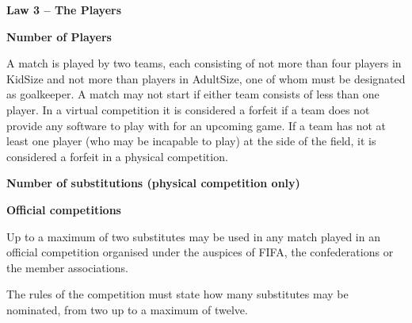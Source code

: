 \clearpage
\sffamily

{\bfseries\color[rgb]{0.4,0.4,0.4}
Law 3 -- The Players}
{}


\bigskip

{\bfseries Number of Players}

\headlinebox

A match is played by two teams, each consisting of not more than four players in KidSize and not more than  players in AdultSize,
one of whom must be designated as goalkeeper.
A match may not start if either team consists of less than one player.
In a virtual competition it is considered a forfeit if a team does not provide any software to play with for an upcoming game.
If a team has not at least one player (who may be incapable to play) at the side of the field,
it is considered a forfeit in a physical competition.


\bigskip

{\bfseries Number of substitutions (physical competition only)}

\headlinebox
 
{\bfseries Official competitions }

Up to a maximum of two  substitutes may be used in any match played in an official competition organised under the auspices of FIFA, the confederations or the member associations.

The rules of the competition must state how many substitutes may be nominated, from two  up to a maximum of twelve.

\bigskip


